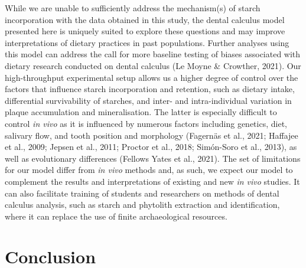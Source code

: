 \documentclass[
  letterpaper,
]{book}
\begin{document}
While we are unable to sufficiently address the mechanism(s) of starch
incorporation with the data obtained in this study, the dental calculus
model presented here is uniquely suited to explore these questions and
may improve interpretations of dietary practices in past populations.
Further analyses using this model can address the call for more baseline
testing of biases associated with dietary research conducted on dental
calculus (Le Moyne \& Crowther, 2021). Our high-throughput experimental
setup allows us a higher degree of control over the factors that
influence starch incorporation and retention, such as dietary intake,
differential survivability of starches, and inter- and intra-individual
variation in plaque accumulation and mineralisation. The latter is
especially difficult to control \emph{in vivo} as it is influenced by
numerous factors including genetics, diet, salivary flow, and tooth
position and morphology (Fagernäs et al., 2021; Haffajee et al., 2009;
Jepsen et al., 2011; Proctor et al., 2018; Simón-Soro et al., 2013), as
well as evolutionary differences (Fellows Yates et al., 2021). The set
of limitations for our model differ from \emph{in vivo} methods and, as
such, we expect our model to complement the results and interpretations
of existing and new \emph{in vivo} studies. It can also facilitate
training of students and researchers on methods of dental calculus
analysis, such as starch and phytolith extraction and identification,
where it can replace the use of finite archaeological resources.


\hypertarget{conclusion}{%
\chapter{Conclusion}\label{conclusion}}
\end{document}
